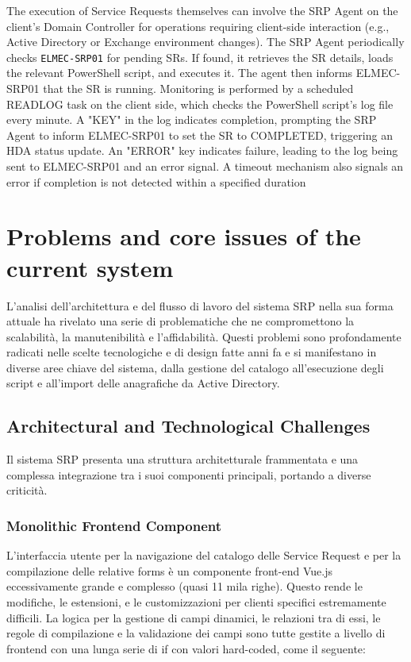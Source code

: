 The execution of Service Requests themselves can involve the SRP Agent on the client's Domain Controller for operations requiring client-side interaction (e.g., Active Directory or Exchange environment changes). The SRP Agent periodically checks \texttt{ELMEC-SRP01} for pending SRs. If found, it retrieves the SR details, loads the relevant PowerShell script, and executes it. The agent then informs ELMEC-SRP01 that the SR is running. Monitoring is performed by a scheduled READLOG task on the client side, which checks the PowerShell script's log file every minute. A "KEY" in the log indicates completion, prompting the SRP Agent to inform ELMEC-SRP01 to set the SR to COMPLETED, triggering an HDA status update. An "ERROR" key indicates failure, leading to the log being sent to ELMEC-SRP01 and an error signal. A timeout mechanism also signals an error if completion is not detected within a specified duration


\section{Problems and core issues of the current system}
L'analisi dell'architettura e del flusso di lavoro del sistema SRP nella sua forma attuale ha rivelato una serie di problematiche che ne compromettono la scalabilità, la manutenibilità e l'affidabilità. Questi problemi sono profondamente radicati nelle scelte tecnologiche e di design fatte anni fa e si manifestano in diverse aree chiave del sistema, dalla gestione del catalogo all'esecuzione degli script e all'import delle anagrafiche da Active Directory.

\subsection{Architectural and Technological Challenges}

Il sistema SRP presenta una struttura architetturale frammentata e una complessa integrazione tra i suoi componenti principali, portando a diverse criticità.

\subsubsection{Monolithic Frontend Component}
L'interfaccia utente per la navigazione del catalogo delle Service Request e per la compilazione delle relative forms è un componente front-end Vue.js eccessivamente grande e complesso (quasi 11 mila righe). Questo rende le modifiche, le estensioni,  e le customizzazioni per clienti specifici estremamente difficili. 
La logica per la gestione di campi dinamici, le relazioni tra di essi, le regole di compilazione e la validazione dei campi sono tutte gestite a livello di frontend con una lunga serie di if con valori hard-coded, come il seguente:

